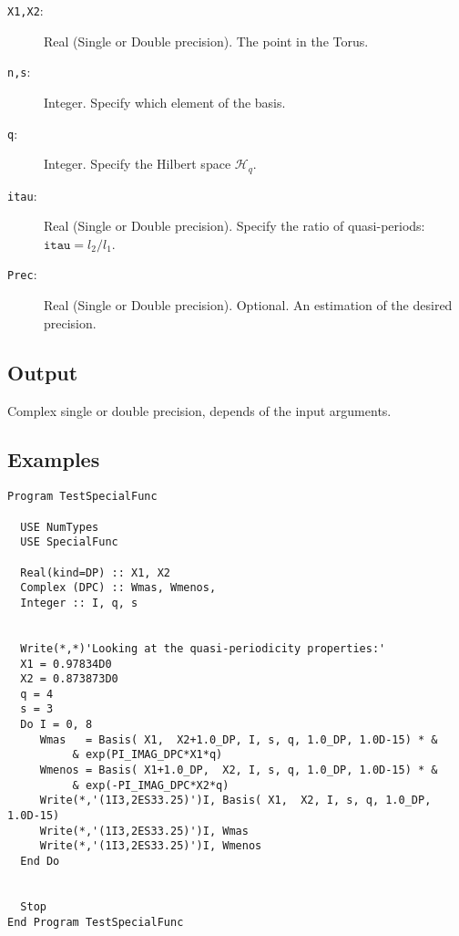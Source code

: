 \begin{description}
\item[\texttt{X1,X2}:] Real (Single or Double precision). The point in
  the Torus.
\item[\texttt{n,s}:] Integer. Specify which element of the basis.
\item[\texttt{q}:] Integer. Specify the Hilbert space $\mathcal H_q$.
\item[\texttt{itau}:] Real (Single or Double precision). Specify the
  ratio of quasi-periods: $\mathtt{itau} = l_2/l_1$.
\item[\texttt{Prec}:] Real (Single or Double precision). Optional. An
  estimation of the desired precision. 
\end{description}

\subsection{Output}

Complex single or double precision, depends of the input  arguments.

\subsection{Examples}

\begin{verbatim}
Program TestSpecialFunc

  USE NumTypes
  USE SpecialFunc

  Real(kind=DP) :: X1, X2
  Complex (DPC) :: Wmas, Wmenos,
  Integer :: I, q, s


  Write(*,*)'Looking at the quasi-periodicity properties:'
  X1 = 0.97834D0
  X2 = 0.873873D0
  q = 4
  s = 3
  Do I = 0, 8
     Wmas   = Basis( X1,  X2+1.0_DP, I, s, q, 1.0_DP, 1.0D-15) * &
          & exp(PI_IMAG_DPC*X1*q)
     Wmenos = Basis( X1+1.0_DP,  X2, I, s, q, 1.0_DP, 1.0D-15) * &
          & exp(-PI_IMAG_DPC*X2*q)
     Write(*,'(1I3,2ES33.25)')I, Basis( X1,  X2, I, s, q, 1.0_DP, 1.0D-15)
     Write(*,'(1I3,2ES33.25)')I, Wmas
     Write(*,'(1I3,2ES33.25)')I, Wmenos
  End Do


  Stop
End Program TestSpecialFunc
\end{verbatim}

